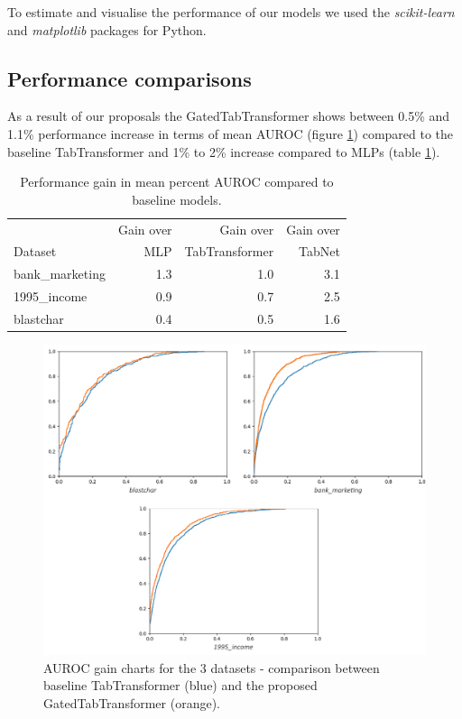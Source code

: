 \documentclass{article}
\begin{document}
To estimate and visualise the performance of our models we used the \textit{scikit-learn} \cite{scikit-learn} and \textit{matplotlib} \cite{Hunter:2007} packages for Python.

\subsection{Performance comparisons}

As a result of our proposals the GatedTabTransformer shows between 0.5\% and 1.1\% performance increase in terms of mean AUROC (figure \ref{fig:auc-results}) compared to the baseline TabTransformer and 1\% to 2\% increase compared to MLPs (table \ref{tab:results-gain}).

\begin{table}[htp]
\caption{
	Performance gain in mean percent AUROC compared to baseline models.
}
\label{tab:results-gain}
\centering
	\begin{tabular}{lrrr}
		\toprule
		        & Gain over & Gain over         & Gain over \\
		Dataset & MLP       & TabTransformer    & TabNet \\
		\midrule
		bank\_marketing  & 1.3 & 1.0 & 3.1 \\
		1995\_income     & 0.9 & 0.7 & 2.5 \\
		blastchar        & 0.4 & 0.5 & 1.6 \\
		\bottomrule
    \end{tabular}
\end{table}

\begin{figure}[hpt]
  \begin{center}
      \includegraphics[width=12.5cm]{roc-comparison.png}
  \end{center}
  \caption{AUROC gain charts for the 3 datasets - comparison between baseline TabTransformer (\textcolor[rgb]{0.12,0.53,0.7}{blue}) and the proposed GatedTabTransformer (\textcolor[rgb]{1,0.4,0}{orange}).}
  \label{fig:auc-results}
\end{figure}
\end{document}
